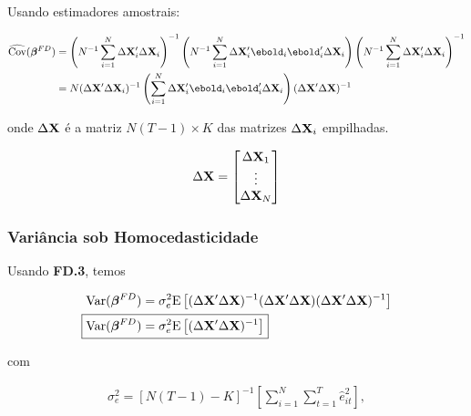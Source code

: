 \documentclass[11pt, oneside, a4paper, article]{article}
\numberwithin{equation}{section}
\begin{document}
\begin{description}
Usando estimadores amostrais:

\begin{center}
\end{center}

\vspace{-1 em}
\begin{align*} 
\widehat{\Cov}( \betavec^{FD} ) &= 
\left( N^{-1} \sum_{i=1}^{N} \Delta \Xmat_{i}' \Delta \Xmat_{i} \right)^{-1}
\left( N^{-1} \sum_{i=1}^{N} \Delta \Xmat_{i}' \ebold_{i}  \ebold_{i}' \Delta \Xmat_{i} \right)
\left( N^{-1} \sum_{i=1}^{N} \Delta \Xmat_{i}' \Delta \Xmat_{i} \right)^{-1}
\\ &=
N
( \Delta \Xmat' \Delta \Xmat_{i} )^{-1}
\left( \sum_{i=1}^{N} \Delta \Xmat_{i}' \ebold_{i}  \ebold_{i}' \Delta \Xmat_{i} \right)
( \Delta \Xmat' \Delta \Xmat )^{-1} 
\end{align*}

\noindent onde $\Delta \mathbf{X}$ é a matriz $N(T-1) \times K$ das matrizes $\Delta \mathbf{X}_{i}$ empilhadas.

\begin{align*}
\Delta \mathbf{X} = 
\begin{bmatrix}
	\Delta \mathbf{X}_{1} \\	\vdots \\ \Delta \mathbf{X}_{N}
\end{bmatrix}
\end{align*}

\subsubsection{Variância sob Homocedasticidade}

Usando \textbf{FD.3}, temos

\vspace{-1 em}
\begin{align*} 
\Var( \betavec^{FD} ) &= 
\sigma_{e}^{2}
\E \left[
( \Delta \Xmat' \Delta \Xmat )^{-1}
( \Delta \Xmat' \Delta \Xmat )
( \Delta \Xmat' \Delta \Xmat )^{-1} 
\right]
\\
\Aboxed{
\Var( \betavec^{FD} ) &= 
\sigma^2_{e}
\E \left[
( \Delta \Xmat' \Delta \Xmat )^{-1} 
\right]}
\end{align*}

\noindent 
com

\vspace{-1 em}
\begin{align*} 
\sigma^2_{e} = 
\left[ N ( T - 1 ) - K \right]^{-1}
\left[  
	\sum_{i=1}^{N} 
	\sum_{t=1}^{T}
	\hat{e}_{it}^{2}
\right],
\end{align*}


\end{description}
\end{document}
